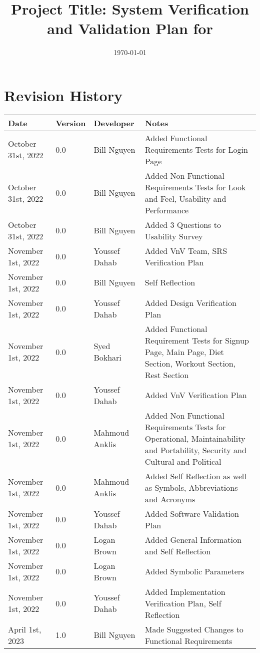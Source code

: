 \documentclass[12pt, titlepage]{article}
\begin{document}
\title{Project Title: System Verification and Validation Plan for \progname{}} 
\author{\authname}
\date{\today}

\maketitle


\section{Revision History}

\begin{tabularx}{\textwidth}{p{3cm}p{2cm}XX}
	\toprule {\bf Date} & {\bf Version} & {\bf Developer}& {\bf Notes}\\
	\midrule
	October 31st, 2022 & 0.0 & Bill Nguyen & Added Functional Requirements Tests for Login Page\\
	October 31st, 2022 & 0.0 & Bill Nguyen & Added Non Functional Requirements Tests for Look and Feel, Usability and Performance\\
	October 31st, 2022 & 0.0 & Bill Nguyen & Added 3 Questions to Usability Survey\\
	November 1st, 2022 & 0.0 & Youssef Dahab & Added VnV Team, SRS Verification Plan\\
	November 1st, 2022 & 0.0 & Bill Nguyen & Self Reflection\\
	November 1st, 2022 & 0.0 & Youssef Dahab & Added Design Verification Plan\\
	November 1st, 2022 & 0.0 & Syed Bokhari & Added Functional Requirement Tests for Signup Page, Main Page, Diet Section, Workout Section, Rest Section\\
	November 1st, 2022 & 0.0 & Youssef Dahab & Added VnV Verification Plan\\
	November 1st, 2022 & 0.0 & Mahmoud Anklis & Added Non Functional Requirements Tests for Operational, Maintainability and Portability, Security and Cultural and Political\\
	November 1st, 2022 & 0.0 & Mahmoud Anklis & Added Self Reflection as well as Symbols, Abbreviations and Acronyms\\
	November 1st, 2022 & 0.0 & Youssef Dahab & Added Software Validation Plan\\
	November 1st, 2022 & 0.0 & Logan Brown & Added General Information and Self Reflection\\
	November 1st, 2022 & 0.0 & Logan Brown & Added Symbolic Parameters\\
	November 1st, 2022 & 0.0 & Youssef Dahab & Added Implementation Verification Plan, Self Reflection\\
    April 1st, 2023 & 1.0 & Bill Nguyen & Made Suggested Changes to Functional Requirements\\
	\bottomrule
\end{tabularx}
\end{document}
